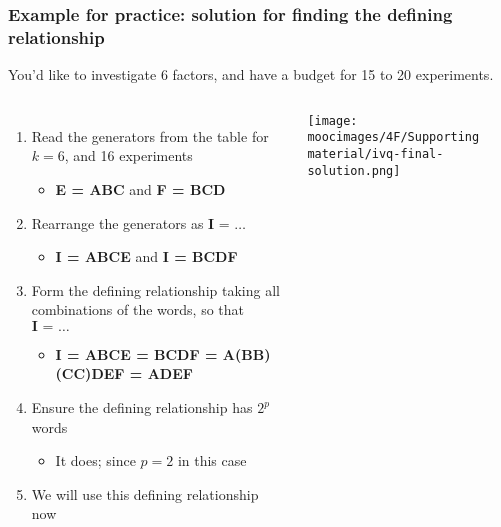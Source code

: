 \documentclass[handout,11pt,aspectratio=169,mathserif]{beamer}
\begin{document}
\begin{frame}\frametitle{Example for practice: {\color{myOrange}solution} for finding the defining relationship}
	
	\vspace{0.5cm}
	You'd like to investigate 6 factors, and have a budget for 15 to 20 experiments.
	
	\vspace{0.5cm}
	\begin{columns}[T]
			\begin{enumerate}
				\item	Read the generators from the table for $k=6$, and 16 experiments
					\begin{itemize}
						\item	\textbf{E = ABC}	and  \textbf{F = BCD}
					\end{itemize}
				\item	Rearrange the generators as  $\textbf{I = \ldots}$
					\begin{itemize}
						\item	\textbf{I = ABCE}	and  \textbf{I = BCDF}
					\end{itemize}
			 	\item	Form the {\color{purple}defining relationship} taking all combinations of the words, so that $\textbf{I = \ldots}$
					\begin{itemize}
						\item	\textbf{I = ABCE = BCDF = A(BB)(CC)DEF = ADEF}
					\end{itemize}
			 	\item	Ensure the defining relationship has $2^p$ words
					\begin{itemize}
						\item	It does; since $p=2$ in this case
					\end{itemize} 
				\item	We will use this defining relationship now
			\end{enumerate}
			
			\centerline{\texttt{[image: \\moocimages/4F/Supporting material/ivq-final-solution.png]}}

	\end{columns}

	
\end{frame}
\end{document}
